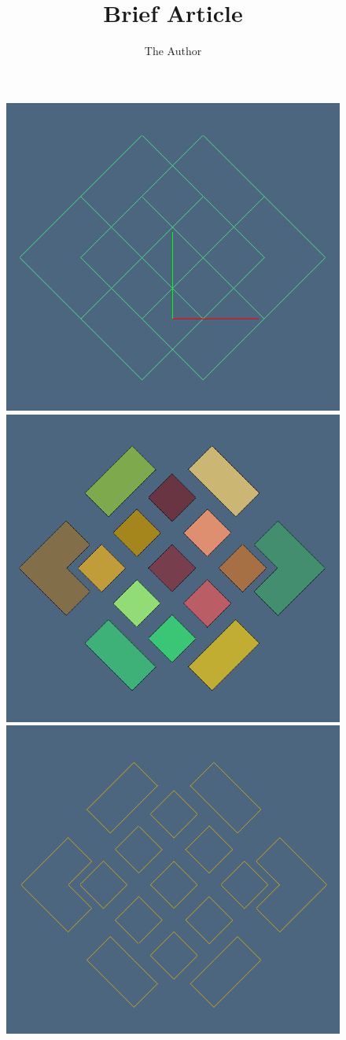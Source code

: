 \documentclass[11pt, oneside]{article}   	%
\title{Brief Article}
\author{The Author}
\begin{document}
\begin{figure}[htbp] %
   \centering
   \includegraphics[height=0.3\textwidth]{1.png}%
   \includegraphics[height=0.3\textwidth]{2.png}%
   \includegraphics[height=0.3\textwidth]{3.png}%
\end{figure}

%
%
\end{document}
